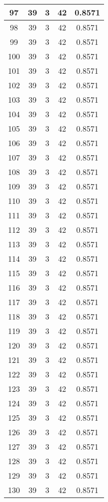 \documentclass[letterpaper, 12pt]{article}
\begin{document}
\begin{longtable}{|c|c|c|c|c|}
\hline
97 & 39 & 3 & 42 & 0.8571 \\
\hline
98 & 39 & 3 & 42 & 0.8571 \\
\hline
99 & 39 & 3 & 42 & 0.8571 \\
\hline
100 & 39 & 3 & 42 & 0.8571 \\
\hline
101 & 39 & 3 & 42 & 0.8571 \\
\hline
102 & 39 & 3 & 42 & 0.8571 \\
\hline
103 & 39 & 3 & 42 & 0.8571 \\
\hline
104 & 39 & 3 & 42 & 0.8571 \\
\hline
105 & 39 & 3 & 42 & 0.8571 \\
\hline
106 & 39 & 3 & 42 & 0.8571 \\
\hline
107 & 39 & 3 & 42 & 0.8571 \\
\hline
108 & 39 & 3 & 42 & 0.8571 \\
\hline
109 & 39 & 3 & 42 & 0.8571 \\
\hline
110 & 39 & 3 & 42 & 0.8571 \\
\hline
111 & 39 & 3 & 42 & 0.8571 \\
\hline
112 & 39 & 3 & 42 & 0.8571 \\
\hline
113 & 39 & 3 & 42 & 0.8571 \\
\hline
114 & 39 & 3 & 42 & 0.8571 \\
\hline
115 & 39 & 3 & 42 & 0.8571 \\
\hline
116 & 39 & 3 & 42 & 0.8571 \\
\hline
117 & 39 & 3 & 42 & 0.8571 \\
\hline
118 & 39 & 3 & 42 & 0.8571 \\
\hline
119 & 39 & 3 & 42 & 0.8571 \\
\hline
120 & 39 & 3 & 42 & 0.8571 \\
\hline
121 & 39 & 3 & 42 & 0.8571 \\
\hline
122 & 39 & 3 & 42 & 0.8571 \\
\hline
123 & 39 & 3 & 42 & 0.8571 \\
\hline
124 & 39 & 3 & 42 & 0.8571 \\
\hline
125 & 39 & 3 & 42 & 0.8571 \\
\hline
126 & 39 & 3 & 42 & 0.8571 \\
\hline
127 & 39 & 3 & 42 & 0.8571 \\
\hline
128 & 39 & 3 & 42 & 0.8571 \\
\hline
129 & 39 & 3 & 42 & 0.8571 \\
\hline
130 & 39 & 3 & 42 & 0.8571 \\

\end{longtable}
\end{document}
